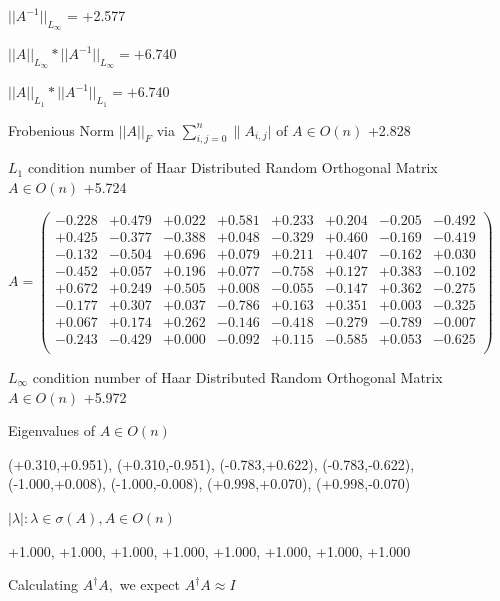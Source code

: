 \documentclass[9pt]{article}
\theoremstyle{plain}
\theoremstyle{definition}
\theoremstyle{remark}
\numberwithin{equation}{section}
\begin{document}
$||A^{-1}||_{L_{\infty}}$ = +2.577

$||A||_{L_{\infty}} * ||A^{-1}||_{L_{\infty}} = +6.740$

$||A||_{L_1} * ||A^{-1}||_{L_1} = +6.740$

Frobenious Norm  $||A||_{\textit{F}}$ via $\sum\limits_{i,j =0}^{n} \|A_{i,j}|$   of  $A \in O(n)$  +2.828

$L_1$ condition number of Haar Distributed Random Orthogonal Matrix $A \in O(n)$ +5.724

$A = \left(
\begin{array}{
cccccccc}
-0.228 & +0.479 & +0.022 & +0.581 & +0.233 & +0.204 & -0.205 & -0.492 \\
+0.425 & -0.377 & -0.388 & +0.048 & -0.329 & +0.460 & -0.169 & -0.419 \\
-0.132 & -0.504 & +0.696 & +0.079 & +0.211 & +0.407 & -0.162 & +0.030 \\
-0.452 & +0.057 & +0.196 & +0.077 & -0.758 & +0.127 & +0.383 & -0.102 \\
+0.672 & +0.249 & +0.505 & +0.008 & -0.055 & -0.147 & +0.362 & -0.275 \\
-0.177 & +0.307 & +0.037 & -0.786 & +0.163 & +0.351 & +0.003 & -0.325 \\
+0.067 & +0.174 & +0.262 & -0.146 & -0.418 & -0.279 & -0.789 & -0.007 \\
-0.243 & -0.429 & +0.000 & -0.092 & +0.115 & -0.585 & +0.053 & -0.625 \\
\end{array}
\right)$ \newline 

$L_{\infty}$ condition number of Haar Distributed Random Orthogonal Matrix $A \in O(n)$ +5.972

Eigenvalues of $A \in O(n)$

(+0.310,+0.951), (+0.310,-0.951), (-0.783,+0.622), (-0.783,-0.622), (-1.000,+0.008), (-1.000,-0.008), (+0.998,+0.070), (+0.998,-0.070)

 $|\lambda | : \lambda \in \sigma(A) , A \in O(n)$

+1.000, +1.000, +1.000, +1.000, +1.000, +1.000, +1.000, +1.000


Calculating $A^{\dag} A,$  we expect $A^{\dag} A \approx I$
\end{document}

